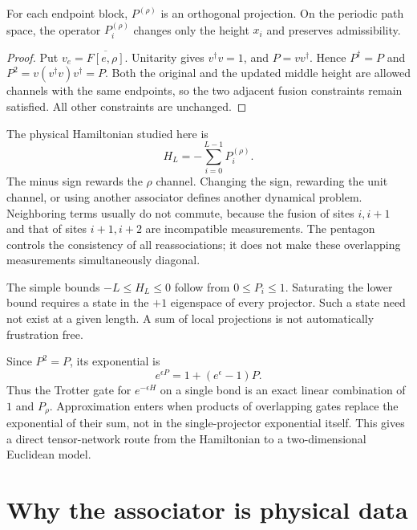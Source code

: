 \begin{proposition}
For each endpoint block, $P^{(\rho)}$ is an orthogonal projection. On the
periodic path space, the operator $P_i^{(\rho)}$ changes only the height
$x_i$ and preserves admissibility.
\end{proposition}
\begin{proof}
Put $v_e=\overline{F[e,\rho]}$. Unitarity gives $v^\dagger v=1$, and
\(P=vv^\dagger\). Hence $P^\dagger=P$ and
$P^2=v(v^\dagger v)v^\dagger=P$. Both the original and the updated middle
height are allowed channels with the same endpoints, so the two adjacent
fusion constraints remain satisfied. All other constraints are unchanged.
\end{proof}

The physical Hamiltonian studied here is
\begin{equation}
 H_L=-\sum_{i=0}^{L-1}P_i^{(\rho)}.
 \label{eq:physical-chain-H}
\end{equation}
The minus sign rewards the $\rho$ channel. Changing the sign, rewarding the
unit channel, or using another associator defines another dynamical problem.
Neighboring terms usually do not commute, because the fusion of sites
$i,i+1$ and that of sites $i+1,i+2$ are incompatible measurements. The
pentagon controls the consistency of all reassociations; it does not make
these overlapping measurements simultaneously diagonal.

The simple bounds $-L\leq H_L\leq0$ follow from $0\leq P_i\leq1$.
Saturating the lower bound requires a state in the $+1$ eigenspace of every
projector. Such a state need not exist at a given length. A sum of local
projections is not automatically frustration free.

\begin{example}
Since $P^2=P$, its exponential is
\[
 e^{\epsilon P}=1+(e^\epsilon-1)P.
\]
Thus the Trotter gate for $e^{-\epsilon H}$ on a single bond is an exact
linear combination of $1$ and $P_\rho$. Approximation enters when products
of overlapping gates replace the exponential of their sum, not in the
single-projector exponential itself. This gives a direct tensor-network
route from the Hamiltonian to a two-dimensional Euclidean model.
\end{example}

\section{Why the associator is physical data}

